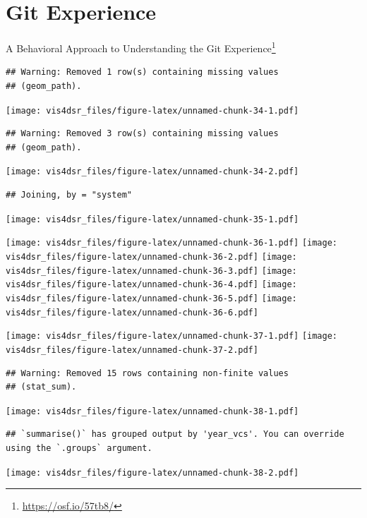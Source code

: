 \documentclass[
]{krantz}
\renewcommand{\href}[2]{#2\footnote{\url{#1}}}
\begin{document}
\hypertarget{git-experience}{%
\section*{Git Experience}\label{git-experience}}


\href{https://osf.io/57tb8/}{A Behavioral Approach to Understanding the Git Experience}

\begin{verbatim}
## Warning: Removed 1 row(s) containing missing values
## (geom_path).
\end{verbatim}

\texttt{[image: vis4dsr\_files/figure-latex/unnamed-chunk-34-1.pdf]}

\begin{verbatim}
## Warning: Removed 3 row(s) containing missing values
## (geom_path).
\end{verbatim}

\texttt{[image: vis4dsr\_files/figure-latex/unnamed-chunk-34-2.pdf]}

\begin{verbatim}
## Joining, by = "system"
\end{verbatim}

\texttt{[image: vis4dsr\_files/figure-latex/unnamed-chunk-35-1.pdf]}

\texttt{[image: vis4dsr\_files/figure-latex/unnamed-chunk-36-1.pdf]} \texttt{[image: vis4dsr\_files/figure-latex/unnamed-chunk-36-2.pdf]} \texttt{[image: vis4dsr\_files/figure-latex/unnamed-chunk-36-3.pdf]} \texttt{[image: vis4dsr\_files/figure-latex/unnamed-chunk-36-4.pdf]} \texttt{[image: vis4dsr\_files/figure-latex/unnamed-chunk-36-5.pdf]} \texttt{[image: vis4dsr\_files/figure-latex/unnamed-chunk-36-6.pdf]}

\texttt{[image: vis4dsr\_files/figure-latex/unnamed-chunk-37-1.pdf]} \texttt{[image: vis4dsr\_files/figure-latex/unnamed-chunk-37-2.pdf]}

\begin{verbatim}
## Warning: Removed 15 rows containing non-finite values
## (stat_sum).
\end{verbatim}

\texttt{[image: vis4dsr\_files/figure-latex/unnamed-chunk-38-1.pdf]}

\begin{verbatim}
## `summarise()` has grouped output by 'year_vcs'. You can override using the `.groups` argument.
\end{verbatim}

\texttt{[image: vis4dsr\_files/figure-latex/unnamed-chunk-38-2.pdf]}
\end{document}

